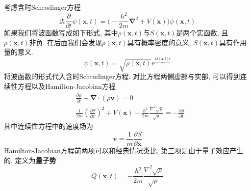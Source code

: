         考虑含时Schrodinger方程
        \begin{equation}
            \mathrm{i}\hbar \frac {\partial}{\partial t} \psi(\bm{x},t) = \bigg( - \frac {\hbar^2}{2m}\bm{\nabla}^2 + V(\bm{x})\bigg) \psi(\bm{x},t)
        \end{equation}
        如果我们将波函数写成如下形式, 其中$\rho(\bm{x},t)$与$S(\bm{x},t)$是两个实函数, 且$\rho(\bm{x},t)$非负. 在后面我们会发现$\rho(\bm{x},t)$具有概率密度的意义, $S(\bm{x},t)$具有作用量的意义. 
        \begin{equation}
            \psi(\bm{x},t) = \sqrt{\rho(\bm{x},t)} \mathrm{e}^{\frac {\mathrm{i}S(\bm{x},t)t}{\hbar}}
        \end{equation}
        将波函数的形式代入含时Schrodinger方程. 对比方程两侧虚部与实部, 可以得到连续性方程以及Hamilton-Jacobian方程
        \begin{equation}\begin{aligned}
            &\frac {\partial \rho}{\partial t} + \bm{\nabla} \cdot (\rho \bm{v}) = 0 \\
            &\frac {1}{2m} \left(\frac {\partial S}{\partial x} \right)^2 + V(\bm{x}) - \frac {\hbar^2}{2m} \frac {\nabla^2 \sqrt{\rho}}{\sqrt{\rho}} = -\frac {\partial S}{\partial t}
        \end{aligned}\end{equation}
        其中连续性方程中的速度场为
        \begin{equation}
            \bm{v} = \frac 1m \frac {\partial S}{\partial \bm{x}}
        \end{equation}
        Hamilton-Jacobian方程前两项可以和经典情况类比, 第三项是由于量子效应产生的, 定义为\textbf{量子势}
        \begin{equation}
            Q(\bm{x},t) = - \frac {\hbar^2}{2m} \frac {\nabla^2 \sqrt{\rho}}{\sqrt{\rho}}
        \end{equation}


